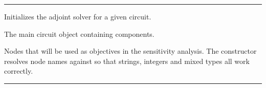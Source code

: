 \documentclass[letterpaper,10pt,english]{sphinxmanual}
\begin{document}
\bigskip\hrule\bigskip


\begin{fulllineitems}
\label{\detokenize{adjoint_engine:AdjointEngine}}
\pysigstartsignatures
\pysiglinewithargsret
{}
{\sphinxparamcomma {}}
{}
\pysigstopsignatures
\sphinxAtStartPar
Initializes the adjoint solver for a given circuit.

\begin{fulllineitems}
\label{\detokenize{adjoint_engine:AdjointEngine.circuit}}
\pysigstartsignatures
\pysigline
{}
\pysigstopsignatures
\sphinxAtStartPar
{} \textendash{} The main circuit object containing components.

\end{fulllineitems}


\begin{fulllineitems}
\label{\detokenize{adjoint_engine:AdjointEngine.output_nodes}}
\pysigstartsignatures
\pysigline
{}
\pysigstopsignatures
\sphinxAtStartPar
{} \textendash{} Nodes that will be used as objectives in the sensitivity analysis.
The constructor resolves node names against  so that
strings, integers and mixed types all work correctly.

\end{fulllineitems}


\end{fulllineitems}



\bigskip\hrule\bigskip

\end{document}
